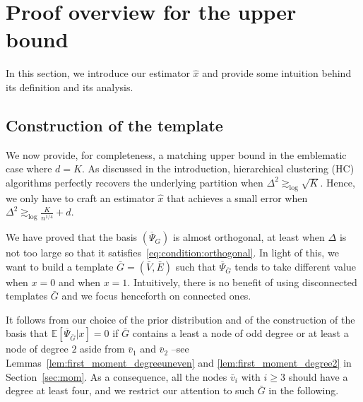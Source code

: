 \documentclass{article}
\begin{document}
    
    
        



\section{Proof overview for the upper bound} \label{sec:upper}

In this section, we introduce our estimator $\hat{x}$ and provide some intuition behind its definition and its analysis.

\subsection{Construction of the template}


 We now provide, for completeness,  a matching upper bound in the emblematic case where $d=K$. As discussed in the introduction, hierarchical clustering (HC) algorithms perfectly recovers the underlying partition when $\Delta^2\gtrsim_{\log} \sqrt{K}$. Hence, we only have to craft an estimator $\hat{x}$ that achieves a small error when $\Delta^2 \gtrsim_{\log} \frac{K}{n^{1/4}}+ d$. 


 
 
 We have proved that the basis $(\overline{\Psi}_{G})$ is almost orthogonal, at least when $\Delta$ is not too large so that it satisfies~\eqref{eq:condition:orthogonal}. In light of this, we want to build a template  $\bar{G}=(\bar{V},\bar{E})$ such that 
 $\overline{\Psi}_{\bar{G}}$ tends to take different value when $x=0$ and when $x=1$. Intuitively, there is no benefit of using disconnected templates $\bar{G}$ and we focus henceforth on connected ones. 
 
 


 It follows from our choice of the prior distribution and of the construction of the basis that  $\mathbb{E}[\overline{\Psi}_{\bar{G}}|x]=0$ if $\bar{G}$ contains a least a node of odd degree or at least a node of degree $2$ aside from $\bar{v}_1$ and $\bar{v}_2$ --see Lemmas~\ref{lem:first_moment_degreeuneven} and \ref{lem:first_moment_degree2} in Section~\ref{sec:mom}. As a consequence, all the nodes $\bar{v}_i$ with $i\geq 3$ should have a degree at least four, and we restrict our attention to such $\bar{G}$ in the following. 
\end{document}
